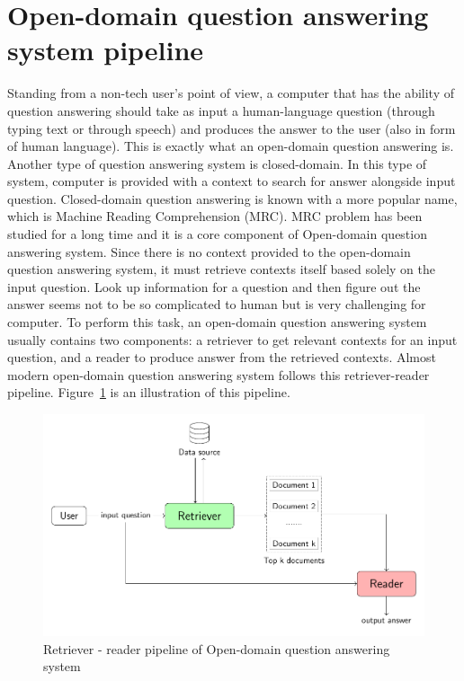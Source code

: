 \documentclass[12pt, sort&compress]{report}
\begin{document}
\section{Open-domain question answering system pipeline}
\label{sec:3.1}
Standing from a non-tech user's point of view, a computer that has the ability of question answering should take as input a human-language question (through typing text or through speech) and produces the answer to the user (also in form of human language). This is exactly what an open-domain question answering is. Another type of question answering system is closed-domain. In this type of system, computer is provided with a context to search for answer alongside input question. Closed-domain question answering is known with a more popular name, which is Machine Reading Comprehension (MRC). MRC problem has been studied for a long time and it is a core component of Open-domain question answering system. Since there is no context provided to the open-domain question answering system, it must retrieve contexts itself based solely on the input question. Look up information for a question and then figure out the answer seems not to be so complicated to human but is very challenging for computer. To perform this task, an open-domain question answering system usually contains two components: a retriever to get relevant contexts for an input question, and a reader to produce answer from the retrieved contexts. Almost modern open-domain question answering system follows this retriever-reader pipeline. Figure~\ref{fig:01} is an illustration of this pipeline. 
\begin{figure}[!htbp]
	\centering
	\includegraphics[scale=.8]{images/PDF/overall_arch/architecture.pdf}
	\caption{Retriever - reader pipeline of Open-domain question answering system}
	\label{fig:01}
\end{figure}
\end{document}
